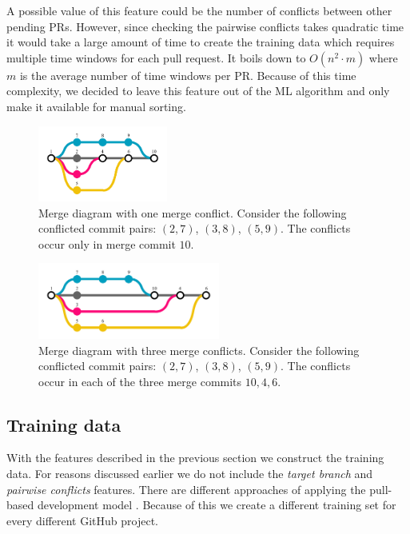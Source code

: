 \begin{description}
A possible value of this feature could be the number of conflicts between other pending PRs.
However, since checking the pairwise conflicts takes quadratic time it would take a large amount of time to create the training data which requires multiple time windows for each pull request.
It boils down to $O(n^2 \cdot m)$ where $m$ is the average number of time windows per PR.
Because of this time complexity, we decided to leave this feature out of the ML algorithm and only make it available for manual sorting.

\begin{figure}
  \centering
  \includegraphics[height=25mm, clip ,trim = 0mm 7mm 0mm 7mm]{../figs/conflicts-1.pdf}
  \caption[Merge diagram with one conflict]
   {Merge diagram with one merge conflict.
   Consider the following conflicted commit pairs: $(2,7)$, $(3,8)$, $(5,9)$.
   The conflicts occur only in merge commit $10$.}
  \label{fig:conflicts-1}
\end{figure}

\begin{figure}
  \centering
  \includegraphics[height=25mm, clip ,trim = 0mm 7mm 0mm 7mm]{../figs/conflicts-3.pdf}
  \caption[Merge diagram with three merge conflicts]
   {Merge diagram with three merge conflicts.
   Consider the following conflicted commit pairs: $(2,7)$, $(3,8)$, $(5,9)$.
   The conflicts occur in each of the three merge commits $10,4,6$.}
  \label{fig:conflicts-3}
\end{figure}

\end{description}

\subsection{Training data}
\label{sec:training}

With the features described in the previous section we construct the training data.
For reasons discussed earlier we do not include the \emph{target branch} and \emph{pairwise conflicts} features.
There are different approaches of applying the pull-based development model \cite{GPD14}.
Because of this we create a different training set for every different GitHub project.

